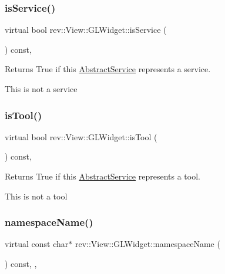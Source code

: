 \subsubsection{\texorpdfstring{isService()}{isService()}}
{\footnotesize\ttfamily virtual bool rev\+::\+View\+::\+G\+L\+Widget\+::is\+Service (\begin{DoxyParamCaption}{ }\end{DoxyParamCaption}) const\hspace{0.3cm}{\ttfamily [inline]}, {\ttfamily [virtual]}}



Returns True if this \mbox{\hyperlink{classrev_1_1_abstract_service}{Abstract\+Service}} represents a service. 

This is not a service \mbox{\label{classrev_1_1_view_1_1_g_l_widget_a131ce2b564a067610856a7a080a091ba}} 
\subsubsection{\texorpdfstring{isTool()}{isTool()}}
{\footnotesize\ttfamily virtual bool rev\+::\+View\+::\+G\+L\+Widget\+::is\+Tool (\begin{DoxyParamCaption}{ }\end{DoxyParamCaption}) const\hspace{0.3cm}{\ttfamily [inline]}, {\ttfamily [virtual]}}



Returns True if this \mbox{\hyperlink{classrev_1_1_abstract_service}{Abstract\+Service}} represents a tool. 

This is not a tool \mbox{\label{classrev_1_1_view_1_1_g_l_widget_aee5ce763da9236cf4b2a707df9f93c3b}} 
\subsubsection{\texorpdfstring{namespaceName()}{namespaceName()}}
{\footnotesize\ttfamily virtual const char$\ast$ rev\+::\+View\+::\+G\+L\+Widget\+::namespace\+Name (\begin{DoxyParamCaption}{ }\end{DoxyParamCaption}) const\hspace{0.3cm}{\ttfamily [inline]}, {\ttfamily [override]}, {\ttfamily [virtual]}}



